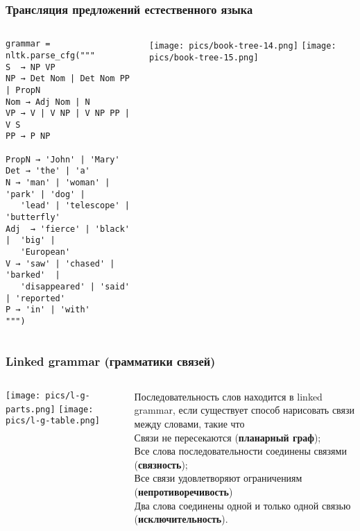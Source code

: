 \documentclass[10pt]{beamer}
\begin{document}
\begin{frame}[fragile]
  \frametitle{Трансляция предложений естественного языка}
   \begin{columns}
     \begin{column}{0.5\textwidth}
\begin{verbatim}
grammar = nltk.parse_cfg("""
S  → NP VP
NP → Det Nom | Det Nom PP | PropN
Nom → Adj Nom | N
VP → V | V NP | V NP PP | V S
PP → P NP

PropN → 'John' | 'Mary'
Det → 'the' | 'a'
N → 'man' | 'woman' | 'park' | 'dog' |
   'lead' | 'telescope' | 'butterfly'
Adj  → 'fierce' | 'black' |  'big' |
   'European'
V → 'saw' | 'chased' | 'barked'  |
   'disappeared' | 'said' | 'reported'
P → 'in' | 'with'
""")
\end{verbatim}
     \end{column}
     \begin{column}{0.5\textwidth}
       \texttt{[image: pics/book-tree-14.png]}
       \texttt{[image: pics/book-tree-15.png]}
     \end{column}
   \end{columns}
 \end{frame}

\begin{frame}
  \frametitle{Linked grammar (грамматики связей)}
  \begin{columns}
    \begin{column}{0.4\textwidth}
      \texttt{[image: pics/l-g-parts.png]}
      \texttt{[image: pics/l-g-table.png]}
    \end{column}
    \begin{column}{0.6\textwidth}
      Последовательность слов находится в linked grammar, если существует способ нарисовать связи между словами, такие что\\[1em]

      Связи не пересекаются (\textbf{планарный граф});\\[0.5em]
      Все слова последовательности соединены связями (\textbf{связность});\\[0.5em]
      Все связи удовлетворяют ограничениям (\textbf{непротиворечивость})\\[0.5em]
      Два слова соединены одной и только одной связью (\textbf{исключительность}).\\[0.5em]
    \end{column}
  \end{columns}
\end{frame}
\end{document}
